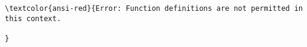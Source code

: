 \documentclass[11pt]{article}
\begin{document}
    \begin{Verbatim}[commandchars=\\\{\}]
\textcolor{ansi-red}{Error: Function definitions are not permitted in this context.

}
    \end{Verbatim}


    
    
    
    
\end{document}
